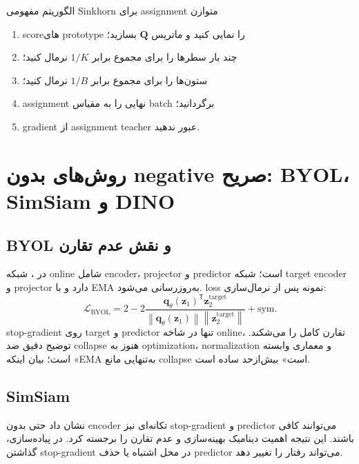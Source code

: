 \documentclass[12pt,openany,oneside]{book}
\newcommand{\norm}[1]{\left\lVert #1\right\rVert}
\newcommand{\trans}{^{\mathsf T}}
\newcommand{\vect}[1]{\bm{#1}}
\newcommand{\mat}[1]{\bm{#1}}
\begin{document}
\begin{algorithmbox}{الگوریتم مفهومی Sinkhorn برای assignment متوازن}
\begin{enumerate}
\item scoreهای prototype را نمایی کنید و ماتریس $\mat Q$ بسازید؛
\item چند بار سطرها را برای مجموع برابر $1/K$ نرمال کنید؛
\item ستون‌ها را برای مجموع برابر $1/B$ نرمال کنید؛
\item assignment نهایی را به مقیاس batch برگردانید؛
\item gradient از assignment teacher عبور ندهید.
\end{enumerate}
\end{algorithmbox}

\section{روش‌های بدون negative صریح: BYOL، SimSiam و DINO}
\subsection{BYOL و نقش عدم تقارن}
در ، شبکه online شامل encoder، projector و predictor است؛ شبکه target encoder و projector دارد و با EMA به‌روزرسانی می‌شود. loss نمونه پس از نرمال‌سازی:
\begin{equation}
\mathcal L_{\mathrm{BYOL}}
=2-2\frac{\vect q_\theta(\vect z_1)\trans\vect z_2^{\mathrm{target}}}
{\norm{\vect q_\theta(\vect z_1)}\norm{\vect z_2^{\mathrm{target}}}}
+\text{sym.}
\end{equation}
stop-gradient روی target و predictor تنها در شاخه online، تقارن کامل را می‌شکند. توضیح دقیق ضد collapse هنوز به optimization، normalization و معماری وابسته است؛ بیان اینکه «EMA به‌تنهایی مانع collapse است» بیش‌ازحد ساده است.

\subsection{SimSiam}
 نشان داد حتی بدون encoder تکانه‌ای نیز stop-gradient و predictor می‌توانند کافی باشند. این نتیجه اهمیت دینامیک بهینه‌سازی و عدم تقارن را برجسته کرد. در پیاده‌سازی، گذاشتن stop-gradient در محل اشتباه یا حذف predictor می‌تواند رفتار را تغییر دهد.
\end{document}

